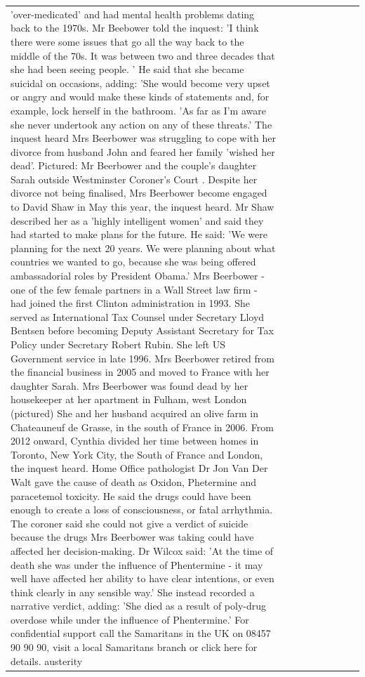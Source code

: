 \begin{table}[H]
\begin{tabular}{lllrlllll}
'over-medicated' and had mental health problems dating back to the 1970s. Mr Beebower told the inquest: 'I think there were some issues that go all the way back to the middle of the 70s. It was between two and three decades that she had been seeing people. ' He said that she became suicidal on occasions, adding: 'She would become very upset or angry and would make these kinds of statements and, for example, lock herself in the bathroom. 'As far as I'm aware she never undertook any action on any of these threats.' The inquest heard Mrs Beerbower was struggling to cope with her divorce from husband John and feared her family 'wished her dead'. Pictured: Mr Beerbower and the couple's daughter Sarah outside Westminster Coroner's Court . Despite her divorce not being finalised, Mrs Beerbower become engaged to David Shaw in May this year, the inquest heard. Mr Shaw described her as a 'highly intelligent women' and said they had started to make plans for the future. He said: 'We were planning for the next 20 years. We were planning about what countries we wanted to go, because she was being offered ambassadorial roles by President Obama.' Mrs Beerbower - one of the few female partners in a Wall Street law firm - had joined the first Clinton administration in 1993. She served as International Tax Counsel under Secretary Lloyd Bentsen before becoming Deputy Assistant Secretary for Tax Policy under Secretary Robert Rubin. She left US Government service in late 1996. Mrs Beerbower retired from the financial business in 2005 and moved to France with her daughter Sarah. Mrs Beerbower was found dead by her housekeeper at her apartment in Fulham, west London (pictured) She and her husband acquired an olive farm in Chateauneuf de Grasse, in the south of France in 2006. From 2012 onward, Cynthia divided her time between homes in Toronto, New York City, the South of France and London, the inquest heard. Home Office pathologist Dr Jon Van Der Walt gave the cause of death as Oxidon, Phetermine and paracetemol toxicity. He said the drugs could have been enough to create a loss of consciousness, or fatal arrhythmia. The coroner said she could not give a verdict of suicide because the drugs Mrs Beerbower was taking could have affected her decision-making. Dr Wilcox said: 'At the time of death she was under the influence of Phentermine - it may well have affected her ability to have clear intentions, or even think clearly in any sensible way.' She instead recorded a narrative verdict, adding: 'She died as a result of poly-drug overdose while under the influence of Phentermine.' For confidential support call the Samaritans in the UK on 08457 90 90 90, visit a local Samaritans branch or click here for details. austerity \\

\end{tabular}
\end{table}
